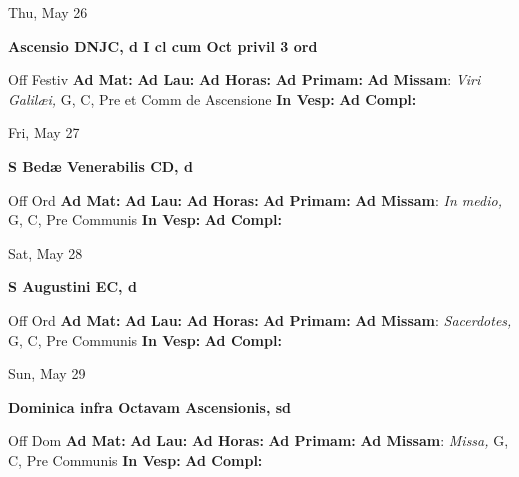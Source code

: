 \documentclass[10pt]{article}
\begin{document}
\begin{minipage}{3.5in}
\vspace{2em}\begin{center}
Thu, May 26
\end{center}\textbf{ \large Ascensio DNJC, \textnormal{\normalsize d I cl cum Oct privil 3 ord}}
\begin{justify}
Off Festiv
\textbf{Ad Mat: }
\textbf{Ad Lau: }
\textbf{Ad Horas: }
\textbf{Ad Primam: }
\textbf{Ad Missam}: \textit{Viri Galilæi,} G, C, Pre et Comm de Ascensione
\textbf{In Vesp: }
\textbf{Ad Compl: }\end{justify}
\end{minipage}



\begin{minipage}{3.5in}
\vspace{2em}\begin{center}
Fri, May 27
\end{center}\textbf{ \large S Bedæ Venerabilis CD, \textnormal{\normalsize d}}
\begin{justify}
Off Ord
\textbf{Ad Mat: }
\textbf{Ad Lau: }
\textbf{Ad Horas: }
\textbf{Ad Primam: }
\textbf{Ad Missam}: \textit{In medio,} G, C, Pre Communis
\textbf{In Vesp: }
\textbf{Ad Compl: }\end{justify}
\end{minipage}



\begin{minipage}{3.5in}
\vspace{2em}\begin{center}
Sat, May 28
\end{center}\textbf{ \large S Augustini EC, \textnormal{\normalsize d}}
\begin{justify}
Off Ord
\textbf{Ad Mat: }
\textbf{Ad Lau: }
\textbf{Ad Horas: }
\textbf{Ad Primam: }
\textbf{Ad Missam}: \textit{Sacerdotes,} G, C, Pre Communis
\textbf{In Vesp: }
\textbf{Ad Compl: }\end{justify}
\end{minipage}



\begin{minipage}{3.5in}
\vspace{2em}\begin{center}
Sun, May 29
\end{center}\textbf{ \large Dominica infra Octavam Ascensionis, \textnormal{\normalsize sd}}
\begin{justify}
Off Dom
\textbf{Ad Mat: }
\textbf{Ad Lau: }
\textbf{Ad Horas: }
\textbf{Ad Primam: }
\textbf{Ad Missam}: \textit{Missa,} G, C, Pre Communis
\textbf{In Vesp: }
\textbf{Ad Compl: }\end{justify}
\end{minipage}
\end{document}
